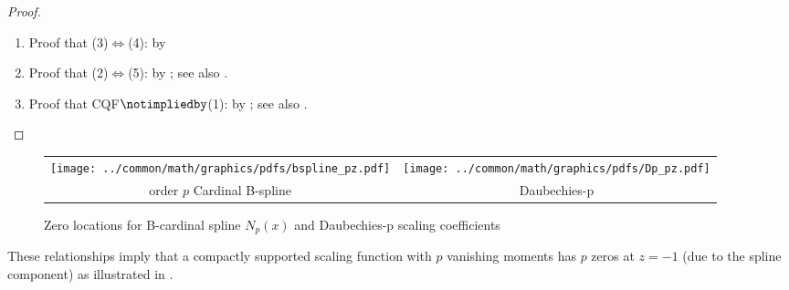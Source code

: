 \begin{proof}
\begin{enumerate}
\item Proof that (3)$\iff$(4): by 
\item Proof that (2)$\iff$(5): by ; see also .
\item Proof that CQF$\notimpliedby$(1): by ; see also .

\end{enumerate}
\end{proof}

\begin{figure}
  \centering%
  \begin{tabular*}{\textwidth-40mm}{@{\extracolsep{\fill}}cc}%
    \texttt{[image: ../common/math/graphics/pdfs/bspline\_pz.pdf]}&\texttt{[image: ../common/math/graphics/pdfs/Dp\_pz.pdf]}\\%
    order $p$ Cardinal B-spline&Daubechies-p%
  \end{tabular*}%
  \caption{
     Zero locations for B-cardinal spline $N_p(x)$ and Daubechies-p scaling coefficients
     \label{fig:vanish_spline_zero}
     }
\end{figure}
These relationships imply that a compactly supported scaling function
with $p$ vanishing moments has $p$ zeros at $z=-1$
(due to the spline component) as illustrated in .

